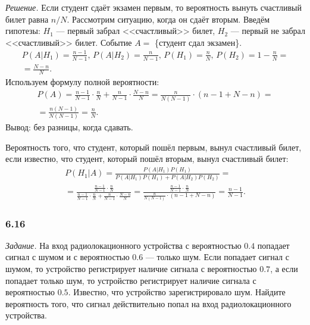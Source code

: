 \textit{Решение.} Если студент сдаёт экзамен первым, то вероятность вынуть счастливый билет равна $n/N$.
Рассмотрим ситуацию, когда он сдаёт вторым.
Введём гипотезы: $H_1$ --- первый забрал <<счастливый>> билет, $H_2$ --- первый не забрал <<счастливый>> билет.
Событие $A =$ \{студент сдал экзамен\}.
\begin{equation*}
\begin{split}
P \left( \left. A \right| H_1 \right) =
\frac{n-1}{N-1}, \,
P \left( \left. A \right| H_2 \right) =
\frac{n}{N-1}, \,
P \left( H_1 \right) =
\frac{n}{N}, \,
P \left( H_2 \right) =
1 - \frac{n}{N} = \\
= \frac{N-n}{N}.
\end{split}
\end{equation*}
Используем формулу полной вероятности:
\begin{equation*}
\begin{split}
P \left( A \right) =
\frac{n-1}{N-1} \cdot \frac{n}{N} + \frac{n}{N-1} \cdot \frac{N-n}{N} =
\frac{n}{N \left( N-1 \right) } \cdot \left( n-1+N-n \right) = \\
= \frac{n \left( N-1 \right) }{N \left( N-1 \right) } =
\frac{n}{N}.
\end{split}
\end{equation*}
Вывод: без разницы, когда сдавать.

Вероятность того, что студент, который пошёл первым, вынул счастливый билет, если известно, что студент, который пошёл вторым, вынул счастливый билет:
\begin{equation*}
\begin{split}
P \left( \left. H_1 \right| A \right) =
\frac{P \left( \left. A \right| H_1 \right) P \left( H_1 \right) }{P \left( \left. A \right| H_1 \right) P \left( H_1 \right) +
P \left( \left. A \right| H_2 \right) P \left( H_2 \right) } = \\
= \frac{ \frac{n-1}{N-1} \cdot \frac{n}{N} }{ \frac{n-1}{N-1} \cdot \frac{n}{N} + \frac{n}{N-1} \cdot \frac{N-n}{N} } =
\frac{ \frac{n-1}{N-1} \cdot \frac{n}{N} }{ \frac{n}{N \left( N-1 \right) } \cdot \left( n-1+N-n \right) } =
\frac{n-1}{N-1}.
\end{split}
\end{equation*}

\subsubsection*{6.16}

\textit{Задание.} На вход радиолокационного устройства с вероятностью $0.4$ попадает сигнал с шумом и с вероятностью $0.6$ --- только шум.
Если попадает сигнал с шумом, то устройство регистрирует наличие сигнала с вероятностью $0.7$, а если попадает только шум,
то устройство регистрирует наличие сигнала с вероятностью $0.5$.
Известно, что устройство зарегистрировало шум.
Найдите вероятность того, что сигнал действительно попал на вход радиолокационного устройства.

